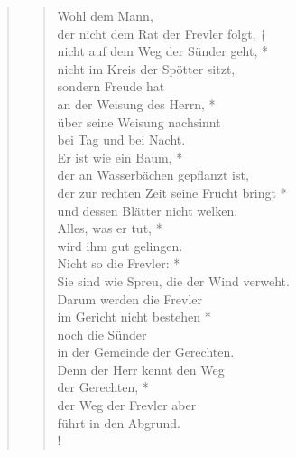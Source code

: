 

\begin{quote}
\begin{verse}


\smallskip

Wohl dem Mann,\\
der nicht dem Rat der Frevler folgt, †\\
nicht auf dem Weg der Sünder geht, *\\
nicht im Kreis der Spötter sitzt,\\
\vin sondern Freude hat\\
\vin an der Weisung des Herrn, *\\
\vin über seine Weisung nachsinnt\\
\vin bei Tag und bei Nacht.\\
Er ist wie ein Baum, *\\
der an Wasserbächen gepflanzt ist, \\
\vin der zur rechten Zeit seine Frucht bringt *\\
\vin und dessen Blätter nicht welken.\\
Alles, was er tut, *\\
wird ihm gut gelingen.\\
\vin Nicht so die Frevler: *\\
\vin Sie sind wie Spreu, die der Wind verweht.\\
Darum werden die Frevler\\
im Gericht nicht bestehen *\\
noch die Sünder\\
in der Gemeinde der Gerechten.\\
\vin Denn der Herr kennt den Weg\\
\vin der Gerechten, *\\
\vin der Weg der Frevler aber\\
\vin führt in den Abgrund.\\!

\end{verse}

\begin{verse}


\smallskip


\end{verse}
\end{quote}
